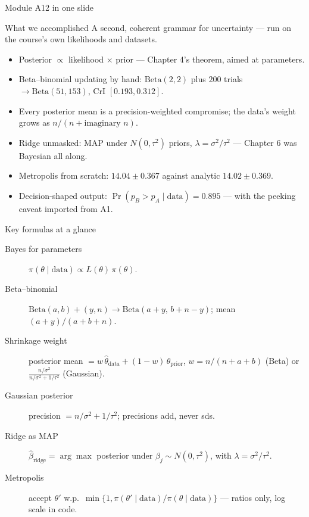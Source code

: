 \documentclass[aspectratio=169,11pt]{beamer}
\begin{document}
\begin{frame}{Module A12 in one slide}
  \begin{block}{What we accomplished}
    A second, coherent grammar for uncertainty --- run on the course's own
    likelihoods and datasets.
  \end{block}
  \begin{itemize}
    \item Posterior $\propto$ likelihood $\times$ prior --- Chapter 4's theorem,
          aimed at parameters.
    \item Beta--binomial updating by hand: $\text{Beta}(2,2)$ plus $200$ trials
          $\to \text{Beta}(51,153)$, CrI $[0.193, 0.312]$.
    \item Every posterior mean is a precision-weighted compromise; the data's
          weight grows as $n / (n + \text{imaginary } n)$.
    \item Ridge unmasked: MAP under $N(0, \tau^2)$ priors, $\lambda =
          \sigma^2/\tau^2$ --- Chapter 6 was Bayesian all along.
    \item Metropolis from scratch: $14.04 \pm 0.367$ against analytic
          $14.02 \pm 0.369$.
    \item Decision-shaped output: $\Pr(p_B > p_A \mid \text{data}) = 0.895$ ---
          with the peeking caveat imported from A1.
  \end{itemize}
\end{frame}

\begin{frame}{Key formulas at a glance}
  \footnotesize
  \begin{description}
    \item[Bayes for parameters] $\pi(\theta \mid \text{data}) \propto
      L(\theta)\,\pi(\theta)$.
    \item[Beta--binomial] $\text{Beta}(a,b) + (y, n) \to
      \text{Beta}(a{+}y,\, b{+}n{-}y)$; mean $(a{+}y)/(a{+}b{+}n)$.
    \item[Shrinkage weight] posterior mean $= w\,\hat\theta_{\text{data}} +
      (1{-}w)\,\theta_{\text{prior}}$, $w = n/(n + a + b)$ (Beta) or
      $\frac{n/\sigma^2}{n/\sigma^2 + 1/\tau^2}$ (Gaussian).
    \item[Gaussian posterior] precision $= n/\sigma^2 + 1/\tau^2$; precisions add,
      never sds.
    \item[Ridge as MAP] $\hat\beta_{\text{ridge}} = \arg\max$ posterior under
      $\beta_j \sim N(0, \tau^2)$, with $\lambda = \sigma^2/\tau^2$.
    \item[Metropolis] accept $\theta'$ w.p.\ $\min\{1,
      \pi(\theta'\mid\text{data})/\pi(\theta\mid\text{data})\}$ --- ratios only,
      log scale in code.
  \end{description}
\end{frame}
\end{document}
